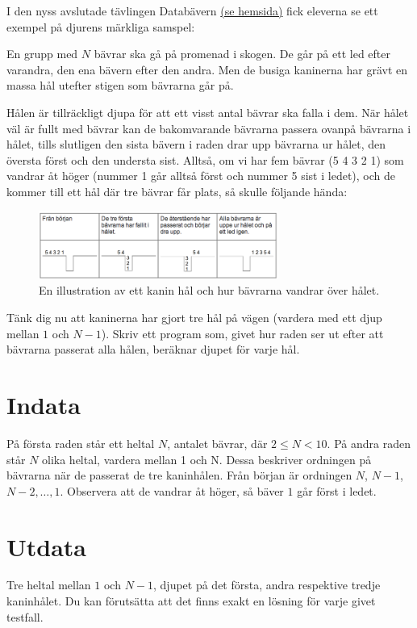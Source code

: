 
I den nyss avslutade tävlingen Databävern \href{www.databavern.se}{(se hemsida)} fick
eleverna se ett exempel på djurens märkliga samspel:

En grupp med $N$ bävrar ska gå på promenad i skogen. De går på ett led efter
varandra, den ena bävern efter den andra. Men de busiga kaninerna har grävt en
massa hål utefter stigen som bävrarna går på.

Hålen är tillräckligt djupa för att ett visst antal bävrar ska falla i dem. När
hålet väl är fullt med bävrar kan de bakomvarande bävrarna passera ovanpå
bävrarna i hålet, tills slutligen den sista bävern i raden drar upp bävrarna ur
hålet, den översta först och den understa sist. Alltså, om vi har fem bävrar (5
4 3 2 1) som vandrar åt höger (nummer 1 går alltså först och nummer 5 sist i
ledet), och de kommer till ett hål där tre bävrar får plats, så skulle följande
hända:

\begin{figure}[ht!]
\centering
\includegraphics[width=0.7\textwidth]{kaninhol.png}
\caption{En illustration av ett kanin hål och hur bävrarna vandrar över hålet.}
\label{overflow}
\end{figure}

Tänk dig nu att kaninerna har gjort tre hål på vägen (vardera med ett djup
mellan $1$ och $N-1$). Skriv ett program som, givet hur raden ser ut efter att
bävrarna passerat alla hålen, beräknar djupet för varje hål.

\section*{Indata}

På första raden står ett heltal $N$, antalet bävrar, där $2 \leq N < 10$. På andra raden
står $N$ olika heltal, vardera mellan 1 och N. Dessa beskriver ordningen på
bävrarna när de passerat de tre kaninhålen. Från början är ordningen $N$, $N-1$,
$N-2,\ldots,1$. Observera att de vandrar åt höger, så bäver $1$ går först i ledet.

\section*{Utdata}

Tre heltal mellan $1$ och $N-1$, djupet på det första, andra respektive tredje
kaninhålet. Du kan förutsätta att det finns exakt en lösning för varje givet
testfall.
